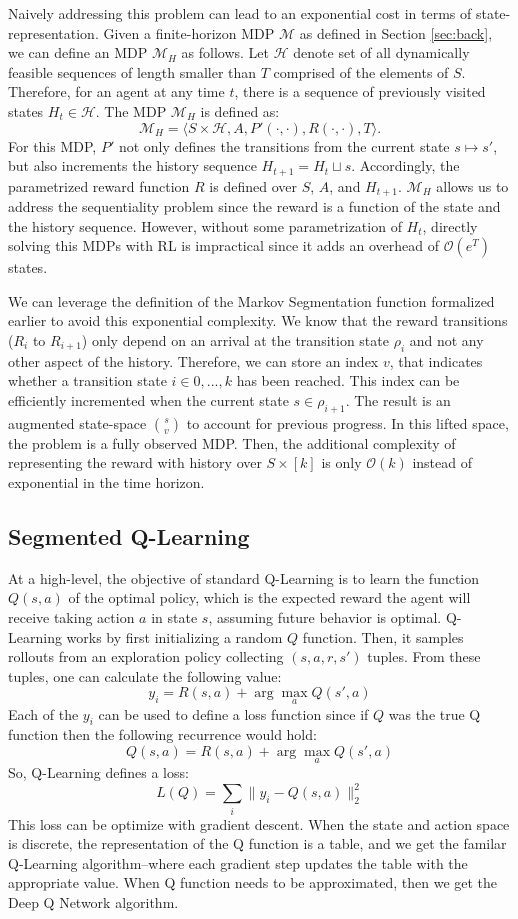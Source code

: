 Naively addressing this problem can lead to an exponential cost in terms of state-representation.
Given a finite-horizon MDP $\mathcal{M}$ as defined in Section \ref{sec:back}, we can define an MDP $\mathcal{M}_H$ as follows.
Let $\mathcal{H}$ denote set of all dynamically feasible sequences of length smaller than $T$ comprised of the elements of $S$.
Therefore, for an agent at any time $t$, there is a sequence of previously visited states $H_t \in \mathcal{H}$.
The MDP $\mathcal{M}_H$ is defined as:
\[
\mathcal{M}_H = \langle S \times \mathcal{H},A,P'(\cdot,\cdot), R(\cdot,\cdot),T \rangle.
\]
For this MDP, $P'$ not only defines the transitions from the current state $s \mapsto s'$, but also increments the history sequence $H_{t+1} = H_{t} \sqcup s$.
Accordingly, the parametrized reward function $R$ is defined over $S$, $A$, and $H_{t+1}$.
$\mathcal{M}_H$ allows us to address the sequentiality problem since the reward is a function of the state and the history sequence.
However, without some parametrization of $H_t$, directly solving this MDPs with RL is impractical since it adds an overhead of $\mathcal{O}(e^{T})$ states.

We can leverage the definition of the Markov Segmentation function formalized earlier to avoid this exponential complexity.
We know that the reward transitions ($R_{i}$ to $R_{i+1}$) only depend on an arrival at the transition state $\rho_{i}$ and not any other aspect of the history.
Therefore, we can store an index $v$, that indicates whether a transition state $i \in 0,...,k$ has been reached.
This index can be efficiently incremented when the current state $s \in \rho_{i+1}$.
The result is an augmented state-space $\binom{s}{v}$ to account for previous progress.
In this lifted space, the problem is a fully observed MDP.
Then, the additional complexity of representing the reward with history over $S \times  [k]$ is only $\mathcal{O}(k)$ instead of exponential in the time horizon.

\subsection{Segmented Q-Learning}
At a high-level, the objective of standard Q-Learning is to learn the function $Q(s,a)$ of the optimal policy, which is the expected reward the agent will receive taking action $a$ in state $s$, assuming future behavior is optimal. 
Q-Learning works by first initializing a random $Q$ function. Then, it samples rollouts from an exploration policy collecting $(s,a,r, s')$ tuples. From these tuples, one can calculate the following value:
\[
y_i = R(s,a) + \arg \max_{a} Q(s',a)
\]
Each of the $y_i$ can be used to define a loss function since if $Q$ was the true Q function then the following recurrence would hold:
\[
Q(s,a) = R(s,a) + \arg \max_{a} Q(s',a)
\]
So, Q-Learning defines a loss:
\[
L(Q) = \sum_{i} \|y_i - Q(s,a)\|_2^2
\]
This loss can be optimize with gradient descent. When the state and action space is discrete, the representation of the Q function is a table, and we get the familar Q-Learning algorithm--where each gradient step updates the table with the appropriate value. When Q function needs to be approximated, then we get the Deep Q Network algorithm.


